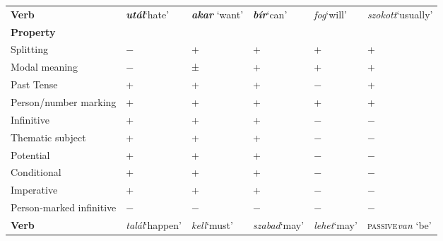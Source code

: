 \documentclass[output=paper]{langsci/langscibook}
\begin{document}
\begin{table}
{\smaller
\begin{tabularx}{\textwidth}{lXXXXX}
\lsptoprule
\textbf{Verb}                    & \textbf{\emph{utál}}\newline ‘hate’ & \textbf{\emph{akar}} ‘want’ & \textbf{\emph{bír}}\newline ‘can’ & \emph{fog}\newline ‘will’ & \emph{szokott}\newline ‘usually’ \\
\textbf{Property}                &                             & &                           &                   & \\
\midrule
Splitting                        & −                           & + & +                         & + & +                                \\
Modal meaning                    & −                           & ± & +                         & + & +                                \\
Past Tense                       & +                           & + & +                         & − & +                                \\
Person/number marking    & +                           & + & +                         & + & +                                \\
Infinitive                       & +                           & + & +                         & − & −                                \\
Thematic subject                 & +                           & + & +                         & − & −                                \\
Potential                        & +                           & + & +                         & − & −                                \\
Conditional                      & +                           & + & +                         & − & −                                \\
Imperative                       & +                           & + & +                         & − & −                                \\
Person-marked infinitive & −                           & − & −                         & − & −                                \\
\midrule
\textbf{Verb}                    & \emph{talál}\newline ‘happen’ & \emph{kell}\newline ‘must’ & \emph{szabad}\newline ‘may’ & \emph{lehet}\newline ‘may’ & \textsc{passive}\newline \emph{van} ‘be’   \\

\end{tabularx}}
\end{table}
\end{document}

